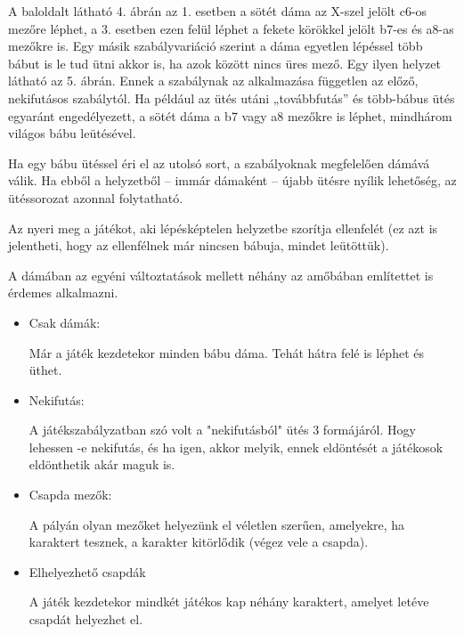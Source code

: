 A baloldalt látható 4. ábrán az 1. esetben a sötét dáma az X-szel jelölt c6-os mezőre léphet, a 3. esetben ezen felül léphet a fekete körökkel jelölt b7-es és a8-as mezőkre is.
Egy másik szabályvariáció szerint a dáma egyetlen lépéssel több bábut is le tud ütni akkor is, ha azok között nincs üres mező. Egy ilyen helyzet látható az 5. ábrán. Ennek a szabálynak az alkalmazása független az előző, nekifutásos szabálytól. Ha például az ütés utáni „továbbfutás” és több-bábus ütés egyaránt engedélyezett, a sötét dáma a b7 vagy a8 mezőkre is léphet, mindhárom világos bábu leütésével.

Ha egy bábu ütéssel éri el az utolsó sort, a szabályoknak megfelelően dámává válik. Ha ebből a helyzetből – immár dámaként – újabb ütésre nyílik lehetőség, az ütéssorozat azonnal folytatható.

Az nyeri meg a játékot, aki lépésképtelen helyzetbe szorítja ellenfelét (ez azt is jelentheti, hogy az ellenfélnek már nincsen bábuja, mindet leütöttük). \cite{checkers-rules}


A dámában az egyéni változtatások mellett néhány az amőbában említettet is érdemes alkalmazni.
\begin{itemize}
	\item Csak dámák:
	
	Már a játék kezdetekor minden bábu dáma. Tehát hátra felé is léphet és üthet.
	\item Nekifutás:
	
	A játékszabályzatban szó volt a "nekifutásból" ütés 3 formájáról. Hogy lehessen -e nekifutás, és ha igen, akkor melyik, ennek eldöntését a játékosok eldönthetik akár maguk is.
	
	\item Csapda mezők:
	
	A pályán olyan mezőket helyezünk el véletlen szerűen, amelyekre, ha karaktert tesznek, a karakter kitörlődik (végez vele a csapda).
	
	\item Elhelyezhető csapdák
	
	A játék kezdetekor mindkét játékos kap néhány karaktert, amelyet letéve csapdát helyezhet el.	
\end{itemize}


